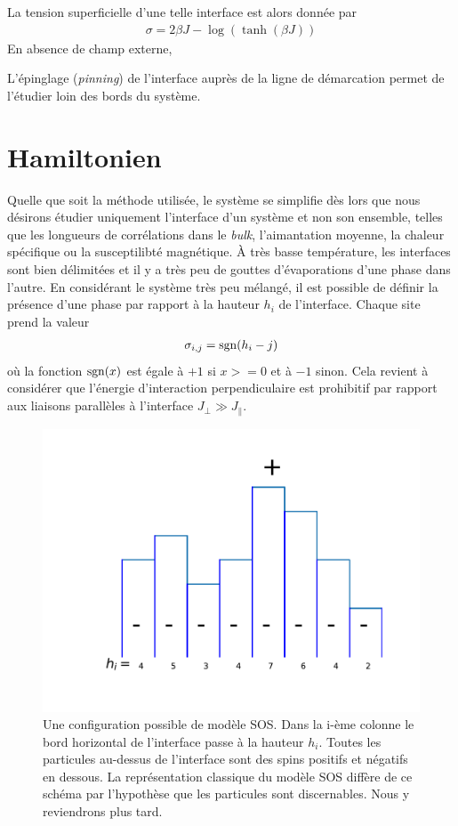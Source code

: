 La tension superficielle d'une telle interface est alors donnée \cite{abraham_transfer_1973,abraham_interface_1976} par
\begin{align}
    \sigma = 2 \beta J - \log(\tanh(\beta J))
\end{align}
En absence de champ externe, 

L'épinglage\cite{} (\textit{pinning}) de l'interface auprès de la ligne de démarcation permet de l'étudier loin des bords du système.		
		
		\section{Hamiltonien}
	
Quelle que soit la méthode utilisée, le système se simplifie dès lors que nous désirons étudier uniquement l'interface d'un système et non son ensemble, telles que les longueurs de corrélations dans le \textit{bulk}, l'aimantation moyenne, la chaleur spécifique ou la susceptilibté magnétique. À très basse température, les interfaces sont bien délimitées et il y a très peu de gouttes d'évaporations d'une phase dans l'autre. En considérant le système très peu mélangé, il est possible de définir la présence d'une phase par rapport à la hauteur $h_i$ de l'interface. Chaque site prend la valeur
\begin{align*}
	\sigma_{i,j} = \operatorname{sgn}(h_i-j)
\end{align*}
où la fonction $\operatorname{sgn}(x)$ est égale à $+1$ si $x>=0$ et à $-1$ sinon. Cela revient à considérer que l'énergie d'interaction perpendiculaire est prohibitif par rapport aux liaisons parallèles à l'interface $J_\perp \gg J_\parallel$. 

\begin{figure}
	\centering
	\includegraphics[scale=1]{isingtosos/sos-indiscernable.pdf}
	\caption{Une configuration possible de modèle SOS. Dans la i-ème colonne le bord horizontal de l'interface passe à la hauteur $h_i$. Toutes les particules au-dessus de l'interface sont des spins positifs et négatifs en dessous. La représentation classique du modèle SOS diffère de ce schéma par l'hypothèse que les particules sont discernables. Nous y reviendrons plus tard.}
\end{figure}


